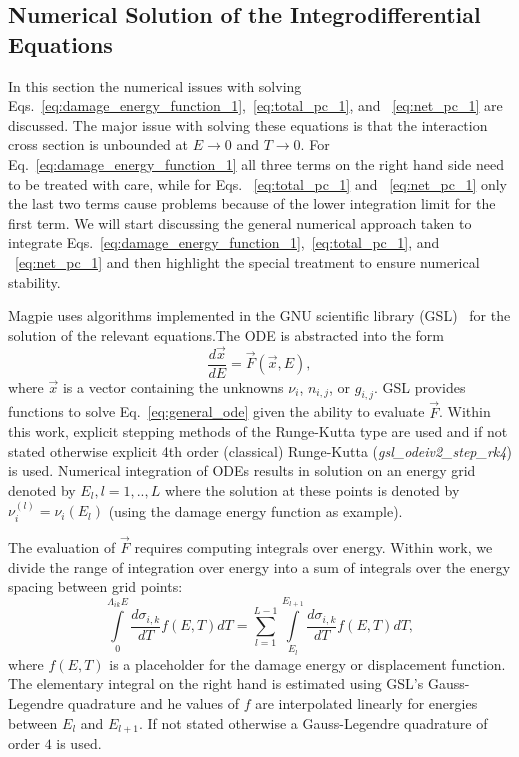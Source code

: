 \documentclass[review]{elsarticle}
\begin{document}
\subsection{Numerical Solution of the Integrodifferential Equations}\label{sec:numerical_results}
In this section the numerical issues with solving Eqs.~\ref{eq:damage_energy_function_1},~\ref{eq:total_pc_1}, and ~\ref{eq:net_pc_1} are discussed. 
The major issue with solving these equations is that the interaction cross section is unbounded at $E \rightarrow 0$ and $T \rightarrow 0$. For Eq.~\ref{eq:damage_energy_function_1} all three terms on the right hand side need to be treated with care, while for Eqs. ~\ref{eq:total_pc_1} and ~\ref{eq:net_pc_1} only the last two terms cause problems because of the lower integration limit for the first term. We will start discussing the general numerical approach taken to integrate Eqs.~\ref{eq:damage_energy_function_1},~\ref{eq:total_pc_1}, and ~\ref{eq:net_pc_1} and then highlight the special treatment to ensure numerical stability.

Magpie uses algorithms implemented in the GNU scientific library (GSL)~\cite{GSL} for the solution of the relevant equations.The ODE is abstracted into the form
\begin{equation}\label{eq:general_ode}
   \frac{d \vec{x}}{dE} = \vec{F} \left( \vec{x},E \right),
\end{equation}
where $\vec{x}$ is a vector containing the unknowns $\nu_i$, $n_{i,j}$, or $g_{i,j}$. GSL provides functions to solve Eq.~\ref{eq:general_ode} given the ability to evaluate $\vec{F}$. Within this work, explicit stepping methods of the Runge-Kutta type are used and if not stated otherwise explicit 4th order (classical) Runge-Kutta (\textit{gsl\_odeiv2\_step\_rk4}) is used. Numerical integration of ODEs results in solution on an energy grid denoted by $E_l, l=1,..,L$ where the solution at these points is denoted by $\nu^{(l)}_i = \nu_i(E_l)$ (using the damage energy function as example).

The evaluation of $\vec{F}$ requires computing integrals over energy. Within work, we divide the range of integration over energy into a sum of integrals over the energy spacing between grid points:
\begin{equation}
  \int\limits_0^{\Lambda_{ik} E} \frac{d \sigma_{i,k}}{dT} f(E,T)  dT = \sum\limits_{l=1}^{L-1} \int\limits_{E_l}^{E_{l+1}}  \frac{d \sigma_{i,k}}{dT}f(E,T)  dT,
\end{equation}
where $f(E,T)$ is a placeholder for the damage energy or displacement function. 
The elementary integral on the right hand is estimated using GSL's Gauss-Legendre quadrature and  
he values of $f$ are interpolated linearly for energies between $E_l$ and $E_{l+1}$. If not stated otherwise a Gauss-Legendre quadrature of order $4$ is used.
\end{document}
